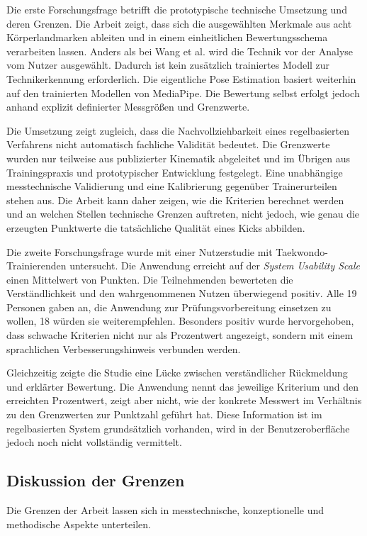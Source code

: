\documentclass[intern]{cgMA}
\begin{document}
Die erste Forschungsfrage betrifft die prototypische technische Umsetzung und deren Grenzen. Die Arbeit zeigt, dass sich die ausgewählten Merkmale aus acht Körperlandmarken ableiten und in einem einheitlichen Bewertungsschema verarbeiten lassen. Anders als bei Wang et al. \cite{Wang2026} wird die Technik vor der Analyse vom Nutzer ausgewählt. Dadurch ist kein zusätzlich trainiertes Modell zur Technikerkennung erforderlich. Die eigentliche Pose Estimation basiert weiterhin auf den trainierten Modellen von MediaPipe. Die Bewertung selbst erfolgt jedoch anhand explizit definierter Messgrößen und Grenzwerte.

Die Umsetzung zeigt zugleich, dass die Nachvollziehbarkeit eines regelbasierten Verfahrens nicht automatisch fachliche Validität bedeutet. Die Grenzwerte wurden nur teilweise aus publizierter Kinematik abgeleitet und im Übrigen aus Trainingspraxis und prototypischer Entwicklung festgelegt. Eine unabhängige messtechnische Validierung und eine Kalibrierung gegenüber Trainerurteilen stehen aus. Die Arbeit kann daher zeigen, wie die Kriterien berechnet werden und an welchen Stellen technische Grenzen auftreten, nicht jedoch, wie genau die erzeugten Punktwerte die tatsächliche Qualität eines Kicks abbilden.

Die zweite Forschungsfrage wurde mit einer Nutzerstudie mit \Nteiln{} Taekwondo-Trainierenden untersucht. Die Anwendung erreicht auf der \textit{System Usability Scale} einen Mittelwert von \SUSm{} Punkten. Die Teilnehmenden bewerteten die Verständlichkeit und den wahrgenommenen Nutzen überwiegend positiv. Alle 19 Personen gaben an, die Anwendung zur Prüfungsvorbereitung einsetzen zu wollen, 18 würden sie weiterempfehlen. Besonders positiv wurde hervorgehoben, dass schwache Kriterien nicht nur als Prozentwert angezeigt, sondern mit einem sprachlichen Verbesserungshinweis verbunden werden.

Gleichzeitig zeigte die Studie eine Lücke zwischen verständlicher Rückmeldung und erklärter Bewertung. Die Anwendung nennt das jeweilige Kriterium und den erreichten Prozentwert, zeigt aber nicht, wie der konkrete Messwert im Verhältnis zu den Grenzwerten zur Punktzahl geführt hat. Diese Information ist im regelbasierten System grundsätzlich vorhanden, wird in der Benutzeroberfläche jedoch noch nicht vollständig vermittelt.

\subsection{Diskussion der Grenzen}
Die Grenzen der Arbeit lassen sich in messtechnische, konzeptionelle und methodische Aspekte unterteilen.
\end{document}
